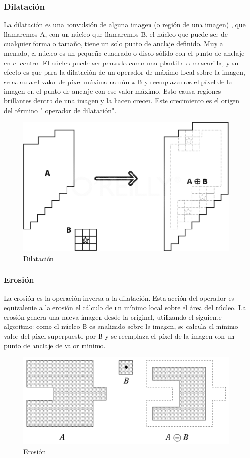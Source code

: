 \subsubsection{Dilatación}
La dilatación es una convulsión de alguna imagen (o región de una imagen) , que llamaremos A, con un núcleo que llamaremos B,
el núcleo que puede ser de cualquier forma o tamaño, tiene un solo punto de anclaje definido. Muy  a menudo, el núcleo es un
pequeño cuadrado o disco sólido con el punto de anclaje en el centro. El núcleo puede ser pensado como una plantilla  o
mascarilla, y su efecto es que para la dilatación de un operador de máximo local sobre la imagen, se calcula el valor de píxel
máximo común a B y reemplazamos el píxel de la imagen en el punto de anclaje con ese valor máximo. Esto causa regiones brillantes
dentro de una imagen y la hacen crecer. Este crecimiento es el origen del término " operador de dilatación". \cite{BookOpenCv}

\begin{figure}[hbtp]

\centering
\includegraphics[scale=0.3]{imagenes/erosion-model.png}
\caption{Dilatación}
\end{figure}


\subsubsection{Erosión}
La erosión es la operación inversa a la dilatación. Esta acción del operador es equivalente a la erosión el cálculo de un mínimo
local sobre el área del núcleo. La erosión genera una nueva imagen desde la original, utilizando el siguiente algoritmo: como el
núcleo B es analizado sobre la imagen, se calcula el mínimo valor del píxel superpuesto por B y se reemplaza el píxel de la
imagen con un punto de anclaje de valor mínimo. \cite{BookOpenCv}

\begin{figure}[hbtp]

\centering
\includegraphics[scale=1]{imagenes/erosion.png}
\caption{Erosión}
\end{figure}
